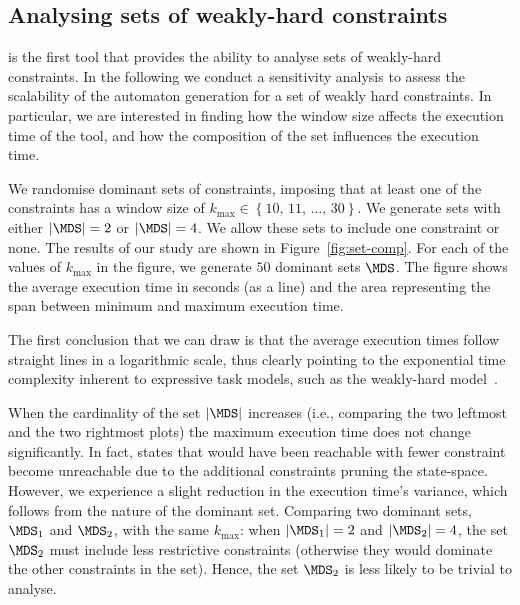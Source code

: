 \begin{figure*}[t]
    
    \caption{Execution time comparison for the generation of the automaton for sets of constraints with increasing maximum window sizes $\max k$.
        Average values are reported alongside the areas between minimum and maximum execution times.}
    \label{fig:set-comp}
\end{figure*}

\subsection{Analysing sets of weakly-hard constraints}
\label{sec:set_evaluation}

\tool{} is the first tool that provides the ability to analyse sets of weakly-hard constraints.
In the following we conduct a sensitivity analysis to assess the scalability of the automaton generation for a set of weakly hard constraints.
In particular, we are interested in finding how the window size affects the execution time of the tool, and how the composition of the set influences the execution time.

We randomise dominant sets of constraints, imposing that at least one of the constraints has a window size of $k_{\max} \in \left\{ 10,\,11,\,\dots,\,30 \right\}$.
We generate sets with either $\abs{\MDS} = 2$ or $\abs{\MDS} = 4$.
We allow these sets to include one \tRH{} constraint or none.
The results of our study are shown in Figure~\ref{fig:set-comp}.
For each of the values of $k_{\max}$ in the figure, we generate $50$ dominant sets $\MDS$.
The figure shows the average execution time in seconds (as a line) and the area representing the span between minimum and maximum execution time.

The first conclusion that we can draw is that the average execution times follow straight lines in a logarithmic scale, thus clearly pointing to the exponential time complexity inherent to expressive task models, such as the weakly-hard model~\cite{Stigge:2015}.

When the cardinality of the set $\abs{\MDS}$ increases (i.e., comparing the two leftmost and the two rightmost plots) the maximum execution time does not change significantly.
In fact, states that would have been reachable with fewer constraint become unreachable due to the additional constraints pruning the state-space.
However, we experience a slight reduction in the execution time's variance, which follows from the nature of the dominant set.
Comparing two dominant sets, $\MDS_1$ and $\MDS_2$, with the same $k_{\max}$: when $\abs{\MDS_1}=2$ and $\abs{\MDS_2}=4$, the set $\MDS_2$ must include less restrictive constraints (otherwise they would dominate the other constraints in the set).
Hence, the set $\MDS_2$ is less likely to be trivial to analyse.


